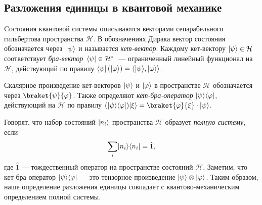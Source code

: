 \documentclass[a4paper,12pt]{article}
\newcommand{\lb}[1]{#1\nobreak\discretionary{}{\hbox{\ensuremath{#1}}}{}}
\numberwithin{equation}{section}
\begin{document}
	\subsection{Разложения единицы в квантовой механике}
	Cостояния квантовой системы описываются векторами сепарабельного гильбертова пространства $\mathcal{H}$. В обозначениях Дирака вектор состояния обозначается через~$\lvert\psi\rangle$ и называется \textit{кет-вектор}. Каждому кет-вектору $\lvert\psi\rangle\in\mathcal{H}$ соответствует \textit{бра-вектор}~$\langle\psi\rvert\in\mathcal{H}^*$~--- ограниченный линейный функционал на $\mathcal{H}$, действующий по правилу $\bra{\psi}\left(\ket{\varphi}\right)\lb=\langle \ket{\psi},\ket{\varphi}\rangle$.

	Скалярное произведение кет-векторов $\lvert\psi\rangle$ и $\lvert\varphi\rangle$ в пространстве $\mathcal{H}$ обозначается через $\braket{\psi}{\varphi}$. Также определяют \textit{кет-бра-оператор} $\lvert\psi\rangle\langle\varphi\rvert$, действующий на $\mathcal{H}$ по правилу $(\ket{\psi}\bra{\varphi})\ket{\xi}=\braket{\varphi}{\xi}\cdot\ket{\psi}$.

	Говорят, что набор состояний $\lvert n_i\rangle$ пространства $\mathcal{H}$ образует \textit{полную систему}, если
		$$\sum_{i}\lvert n_i\rangle\langle n_i\rvert=\hat{1},$$
	где $\hat{1}$ --- тождественный оператор на пространстве состояний $\mathcal{H}$. Заметим, что кет-бра-оператор $\lvert\psi\rangle\langle\varphi\rvert$ --- это тензорное произведение $\lvert\psi\rangle\otimes\lvert\varphi\rangle$. Таким образом, наше определение разложения единицы совпадает с квантово-механическим определением полной системы.\\
	
\end{document}
